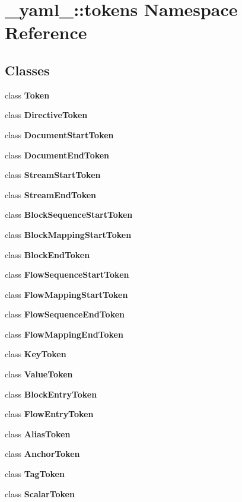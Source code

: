 \section{\_\-yaml\_\-::tokens Namespace Reference}
\label{namespace__yaml___1_1tokens}


\subsection*{Classes}
\begin{CompactItemize}
\item 
class {\bf Token}
\item 
class {\bf DirectiveToken}
\item 
class {\bf DocumentStartToken}
\item 
class {\bf DocumentEndToken}
\item 
class {\bf StreamStartToken}
\item 
class {\bf StreamEndToken}
\item 
class {\bf BlockSequenceStartToken}
\item 
class {\bf BlockMappingStartToken}
\item 
class {\bf BlockEndToken}
\item 
class {\bf FlowSequenceStartToken}
\item 
class {\bf FlowMappingStartToken}
\item 
class {\bf FlowSequenceEndToken}
\item 
class {\bf FlowMappingEndToken}
\item 
class {\bf KeyToken}
\item 
class {\bf ValueToken}
\item 
class {\bf BlockEntryToken}
\item 
class {\bf FlowEntryToken}
\item 
class {\bf AliasToken}
\item 
class {\bf AnchorToken}
\item 
class {\bf TagToken}
\item 
class {\bf ScalarToken}
\end{CompactItemize}
